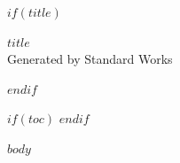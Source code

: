 \documentclass[11pt]{article}
\begin{document}
$if(title)$
\begin{center}
{\LARGE \textbf{$title$}}\\[6pt]
{\small Generated by Standard Works}
\end{center}
\vspace{8pt}
$endif$

$if(toc)$
\tableofcontents
\newpage
$endif$

$body$
\end{document}
